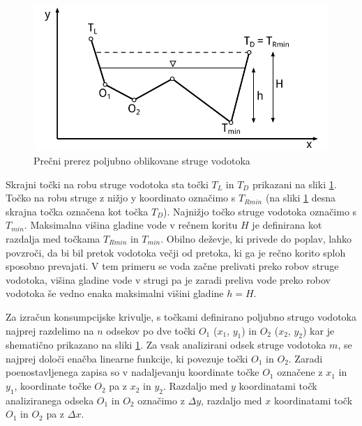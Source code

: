 \begin{figure}[ht!]
	\begin{centering}
		\includegraphics{slike/customChannel/customStruga.pdf}\caption{Prečni prerez poljubno oblikovane struge vodotoka}\label{fig:poljubnaStruga}
	\end{centering}
\end{figure}



Skrajni točki na robu struge vodotoka sta točki $T_L$ in $T_D$ prikazani na sliki \ref{fig:poljubnaStruga}. Točko na robu struge z nižjo y koordinato označimo s $T_{Rmin}$ (na sliki \ref{fig:poljubnaStruga} desna skrajna točka označena kot točka $T_D$). Najnižjo točko struge vodotoka označimo s $T_{min}$. Maksimalna višina gladine vode v rečnem koritu $H$ je definirana kot razdalja med točkama $T_{Rmin}$ in $T_{min}$. Obilno deževje, ki privede do poplav, lahko povzroči, da bi bil pretok vodotoka večji od pretoka, ki ga je rečno korito sploh sposobno prevajati. V tem primeru se voda začne prelivati preko robov struge vodotoka, višina gladine vode v strugi pa je zaradi preliva vode preko robov vodotoka še vedno enaka maksimalni višini gladine $h=H$.



Za izračun konsumpcijske krivulje, s točkami definirano poljubno strugo vodotoka najprej razdelimo na $n$ odsekov po dve točki $O_1$ ($x_1$, $y_1$) in $O_2$ ($x_2$, $y_2$) kar je shematično prikazano na sliki \ref{fig:poljubnaStruga}. Za vsak analizirani odsek struge vodotoka $m$, se najprej določi enačba linearne funkcije, ki povezuje točki $O_1$ in $O_2$.  Zaradi poenostavljenega zapisa so v nadaljevanju koordinate točke $O_1$ označene z $x_1$ in $y_1$, koordinate točke $O_2$ pa z $x_2$ in $y_2$. Razdaljo med $y$ koordinatami točk analiziranega odseka $O_1$ in $O_2$ označimo z $\Delta y$, razdaljo med $x$ koordinatami točk $O_1$ in $O_2$ pa z $\Delta x$.



